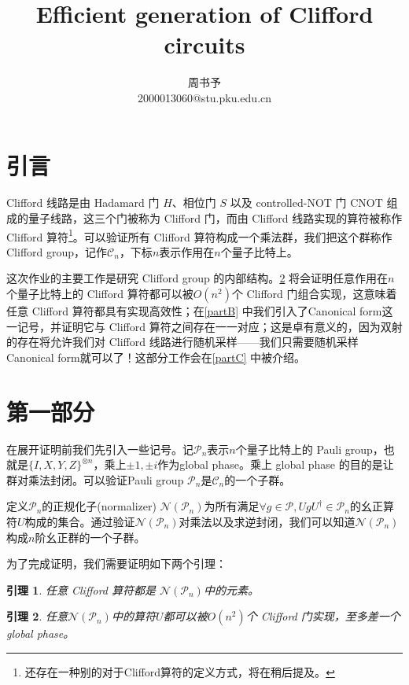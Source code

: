 \documentclass[8pt]{article}
\title{\heiti\zihao{1} Efficient generation of Clifford circuits}
\author{\kaishu\zihao{-3} 周书予\\2000013060@stu.pku.edu.cn}
\newtheorem{lemma}{引理}
\begin{document}
\small
	
 \pagestyle{fancy}
	\chead{}
	
	
\maketitle

\section{引言}
Clifford 线路是由 Hadamard 门 $H$、相位门 $S$ 以及 controlled-NOT 门 $\text{CNOT}$ 组成的量子线路，这三个门被称为 Clifford 门，而由 Clifford 线路实现的算符被称作 Clifford 算符\footnote{还存在一种别的对于Clifford算符的定义方式，将在稍后提及。}。可以验证所有 Clifford 算符构成一个乘法群，我们把这个群称作 Clifford group，记作$\mathcal C_n$，下标$n$表示作用在$n$个量子比特上。

这次作业的主要工作是研究 Clifford group 的内部结构。\cref{partA} 将会证明任意作用在$n$个量子比特上的 Clifford 算符都可以被$O(n^2)$个 Clifford 门组合实现，这意味着任意 Clifford 算符都具有实现高效性；在\cref{partB} 中我们引入了Canonical form这一记号，并证明它与 Clifford 算符之间存在一一对应；这是卓有意义的，因为双射的存在将允许我们对 Clifford 线路进行随机采样——我们只需要随机采样Canonical form就可以了！这部分工作会在\cref{partC} 中被介绍。

\section{第一部分}\label{partA}

在展开证明前我们先引入一些记号。记$\mathcal P_n$表示$n$个量子比特上的 Pauli group，也就是$\{I, X, Y, Z\}^{\otimes n}$，乘上$\pm 1, \pm i$作为global phase。乘上 global phase 的目的是让群对乘法封闭。可以验证Pauli group $\mathcal P_n$是$\mathcal C_n$的一个子群。

定义$\mathcal P_n$的正规化子(normalizer) $\mathcal N(\mathcal P_n)$为所有满足$\forall g \in \mathcal P, UgU^{\dagger} \in \mathcal{P}_n$的幺正算符$U$构成的集合。通过验证$\mathcal N(\mathcal P_n)$对乘法以及求逆封闭，我们可以知道$\mathcal N(\mathcal P_n)$构成$n$阶幺正群的一个子群。

为了完成证明，我们需要证明如下两个引理：

\begin{lemma}
	任意 Clifford 算符都是 $\mathcal N(\mathcal{P}_n)$中的元素。
	\label{lemma1-1}
\end{lemma}
\begin{lemma}
	任意$\mathcal N(\mathcal{P}_n)$中的算符$U$都可以被$O(n^2)$个 Clifford 门实现，至多差一个global phase。
	\label{lemma1-2}
\end{lemma}
\end{document}
